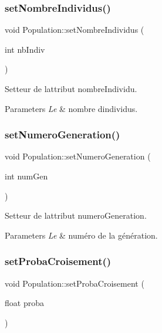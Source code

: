 \subsubsection{\texorpdfstring{set\+Nombre\+Individus()}{setNombreIndividus()}}
{\footnotesize\ttfamily void Population\+::set\+Nombre\+Individus (\begin{DoxyParamCaption}\item[{int}]{nb\+Indiv }\end{DoxyParamCaption})}



Setteur de l\textquotesingle{}attribut nombre\+Individu. 


\begin{DoxyParams}{Parameters}
{\em Le} & nombre d\textquotesingle{}individus. \\
\hline
\end{DoxyParams}
\mbox{\label{class_population_a556851b48bc213bc9a5624295710276d}} 
\subsubsection{\texorpdfstring{set\+Numero\+Generation()}{setNumeroGeneration()}}
{\footnotesize\ttfamily void Population\+::set\+Numero\+Generation (\begin{DoxyParamCaption}\item[{int}]{num\+Gen }\end{DoxyParamCaption})}



Setteur de l\textquotesingle{}attribut numero\+Generation. 


\begin{DoxyParams}{Parameters}
{\em Le} & numéro de la génération. \\
\hline
\end{DoxyParams}
\mbox{\label{class_population_a175f3a21b85681e318063e9eb63550a8}} 
\subsubsection{\texorpdfstring{set\+Proba\+Croisement()}{setProbaCroisement()}}
{\footnotesize\ttfamily void Population\+::set\+Proba\+Croisement (\begin{DoxyParamCaption}\item[{float}]{proba }\end{DoxyParamCaption})}



